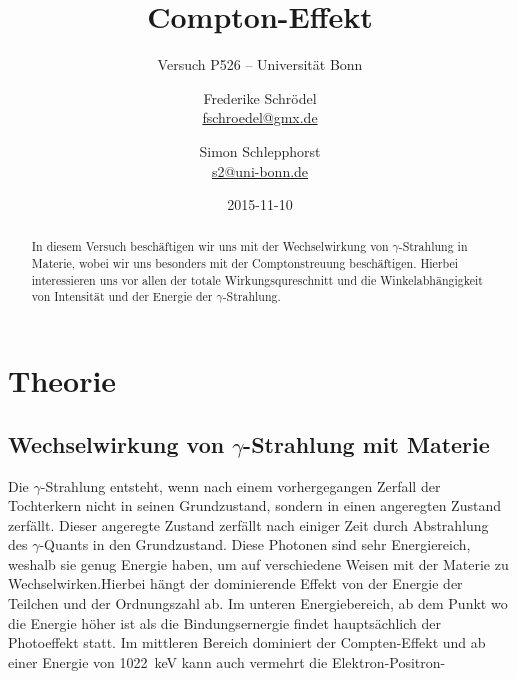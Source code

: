 \documentclass[11pt, ngerman, fleqn, DIV=15, headinclude, BCOR=2cm]{scrreprt}
\title{Compton-Effekt}
\subtitle{Versuch P526 -- Universität Bonn}
\author{
	Frederike Schrödel \\
	\small{\href{mailto:fschroedel@gmx.de}{fschroedel@gmx.de}}
	\and
	Simon Schlepphorst \\
	\small{\href{mailto:s2@uni-bonn.de}{s2@uni-bonn.de}}
}
\date{2015-11-10}
\begin{document}
\maketitle

\begin{abstract}
In diesem Versuch beschäftigen wir uns mit der Wechselwirkung von
$\gamma$-Strahlung in Materie, wobei wir uns besonders mit der
Comptonstreuung beschäftigen.
Hierbei interessieren uns vor allen der totale Wirkungsqureschnitt und die
Winkelabhängigkeit von Intensität und der Energie der $\gamma$-Strahlung.
\end{abstract}

\tableofcontents

\chapter{Theorie}

\section{Wechselwirkung von $\gamma$-Strahlung mit Materie}
\label{sec:WW-strahlung-Materie}
Die $\gamma$-Strahlung entsteht, wenn nach einem vorhergegangen Zerfall der
Tochterkern nicht in seinen Grundzustand, sondern in einen angeregten Zustand
zerfällt.
Dieser angeregte Zustand zerfällt nach einiger Zeit durch Abstrahlung des
$\gamma$-Quants in den Grundzustand. Diese Photonen sind sehr Energiereich,
weshalb sie genug Energie haben, um auf verschiedene Weisen mit der Materie zu
Wechselwirken.Hierbei hängt der dominierende Effekt von der
Energie der Teilchen und der Ordnungszahl ab.
Im unteren Energiebereich, ab dem Punkt wo die Energie höher ist als die
Bindungsernergie findet hauptsächlich der Photoeffekt statt. Im mittleren
Bereich dominiert der Compten-Effekt und ab einer Energie von
\SI{1022}{\kilo\electronvolt} kann auch vermehrt die Elektron-Positron-
\end{document}
